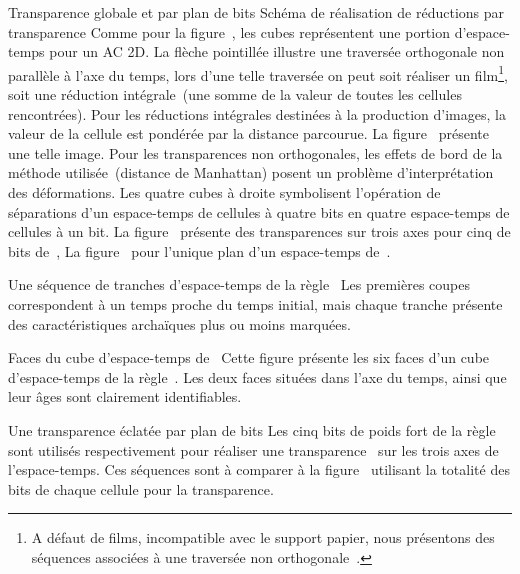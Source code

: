 %
{Transparence globale et par plan de bits}%
{Schéma de réalisation de réductions par transparence}%
{Comme pour la figure~, les cubes représentent une
  portion d'espace-temps pour un AC 2D. %
  La flèche pointillée illustre une traversée orthogonale non parallèle
  à l'axe du temps, lors d'une telle traversée on peut soit réaliser un
  film\footnote{%
    A défaut de films, incompatible avec le support papier, nous
    présentons des séquences associées à une traversée non
    orthogonale~.}, %
  soit une réduction intégrale~(une somme de la valeur de toutes
  les cellules rencontrées). %
  Pour les réductions intégrales destinées à la production d'images,
  la valeur de la cellule est pondérée par la distance parcourue. %
  La figure~ présente une telle
  image. %
  Pour les transparences non orthogonales, les effets de bord de la
  méthode utilisée~(distance de Manhattan) posent un problème
  d'interprétation des déformations. %
  Les quatre cubes à droite symbolisent l'opération de séparations d'un
  espace-temps de cellules à quatre bits en quatre espace-temps de
  cellules à un bit. %
  La figure~ présente des
  transparences sur trois axes pour cinq  de bits
  de~, %
  La figure~ pour l'unique plan d'un
  espace-temps de~.}

%
{}%
{Une séquence de tranches d'espace-temps de la règle~}%
{Les premières coupes correspondent à un temps proche du temps initial,
  mais chaque tranche présente des caractéristiques archaïques plus ou
  moins marquées.}

%
{}%
{Faces du cube d'espace-temps de~}%
{Cette figure présente les six faces d'un cube d'espace-temps de la
  règle~. %
  Les deux faces situées dans l'axe du temps, ainsi que leur âges
  sont clairement identifiables.}

%
{}%
{Une transparence éclatée par plan de bits}%
{Les cinq bits de poids fort de la règle~ sont utilisés
  respectivement pour réaliser une
  transparence~ sur les trois axes de
  l'espace-temps. %
  Ces séquences sont à comparer à la
  figure~ utilisant la totalité des
  bits de chaque cellule pour la transparence.}

